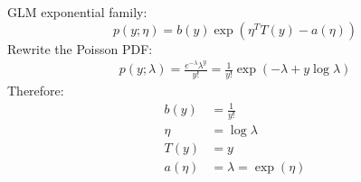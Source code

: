 \begin{answer}
GLM exponential family:
\begin{equation*}
    p(y;\eta) = b(y) \exp\left(\eta^T T(y) - a(\eta)\right)
\end{equation*}
Rewrite the Poisson PDF:
\begin{align*}
p(y; \lambda) = \frac{e^{-\lambda}\lambda^y}{y!} = \frac{1}{y!} \exp\left(-\lambda + y\log\lambda\right)
\end{align*}
Therefore:
\begin{align*}
    b(y) &= \frac{1}{y!} \\
    \eta &= \log{\lambda} \\
    T(y) &= y \\
    a(\eta) &= \lambda = \exp(\eta)
\end{align*}
\end{answer}
